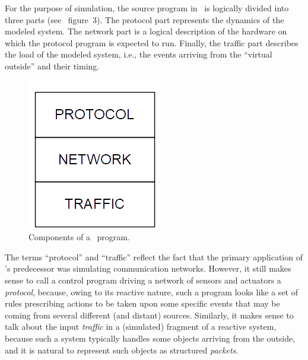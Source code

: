For the purpose of simulation, the source program in \smurph\ is logically
divided into three parts (see~
figure~3).
The protocol part represents the dynamics of the modeled system.
The network part is a logical description of the hardware on which the
protocol program is expected to run.
Finally, the traffic part describes the load of the modeled
system, i.e., the events arriving from the ``virtual outside'' and their
timing.

\begin{figure}[htbp]%
\begin{center}
\includegraphics[scale=0.5]{FIGURES/struct2.png}
\caption{Components of a \smurph\ program.}%
\end{center}
\end{figure}%


The terms ``protocol'' and ``traffic'' reflect the fact that the primary
application of {\smurph}'s predecessor was simulating communication
networks.
However, it still makes sense to call a control program driving a network
of sensors and actuators a {\em protocol}, because, owing to its reactive
nature, such a program looks like a set of rules prescribing actions to be
taken upon some specific events that may be coming from several different
(and distant) sources.
Similarly, it makes sense to talk about the input {\em traffic\/} in a
(simulated) fragment of a reactive system, because such a system typically
handles some objects arriving from the outside, and it is natural to
represent such objects as structured {\em packets}.

